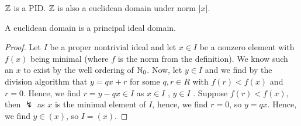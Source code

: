 \begin{example}
\(\mathbb{Z}\) is a PID. \(\mathbb{Z}\) is also a euclidean domain under norm \(\left| x \right| \).
\end{example}
\begin{proposition}
	A euclidean domain is a principal ideal domain.
\end{proposition}
\begin{proof}
	Let \(I\) be a proper nontrivial ideal and let \(x \in I\) be a nonzero element with \(f\left( x \right) \) being minimal (where \(f\) is the norm from the definition). We know such an \(x\) to exist by the well ordering of \(\mathbb{N}_{0}\). Now, let \(y \in I\) and we find by the division algorithm that \( y= qx + r\) for some \(q, r \in R\) with \(f\left( r \right)  < f\left( x \right) \) and \(r = 0\). Hence, we find \(r = y - qx \in I\) as \(x \in I\) , \(y \in I\) . Suppose \(f\left( r \right)  < f\left( x \right) \), then \(\lightning\) as \(x\) is the minimal element of \(I\), hence, we find \(r = 0\), so \(y = qx\). Hence, we find \(y \in \left( x \right) \), so \(I = \left( x \right) \).
\end{proof}


